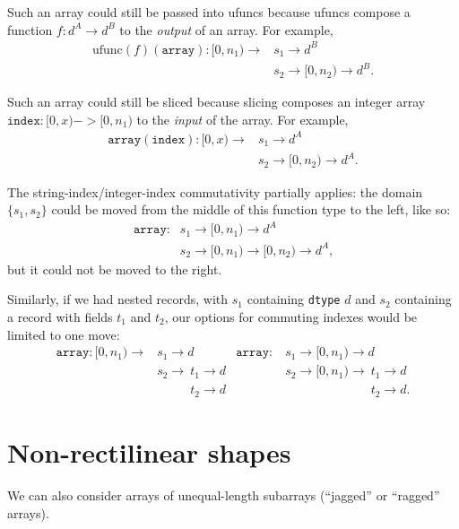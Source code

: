 \documentclass[12pt]{article}
\begin{document}
Such an array could still be passed into ufuncs because ufuncs compose a function $f: d^A \to d^B$ to the {\it output} of an array. For example,
\begin{align*}
\mbox{ufunc}(f)(\texttt{array}): [0, n_1) \to & s_1 \to d^B \\
 & s_2 \to [0, n_2) \to d^B\mbox{.}
\end{align*}

Such an array could still be sliced because slicing composes an integer array $\texttt{index}: [0, x) -> [0, n_1)$ to the {\it input} of the array. For example,
\begin{align*}
\texttt{array}(\texttt{index}): [0, x) \to & s_1 \to d^A \\
 & s_2 \to [0, n_2) \to d^A\mbox{.}
\end{align*}

The string-index/integer-index commutativity partially applies: the domain $\{s_1, s_2\}$ could be moved from the middle of this function type to the left, like so:
\begin{align*}
\texttt{array}: & s_1 \to [0, n_1) \to d^A \\
& s_2 \to [0, n_1) \to [0, n_2) \to d^A\mbox{,}
\end{align*}
\noindent but it could not be moved to the right.

Similarly, if we had nested records, with $s_1$ containing \texttt{dtype} $d$ and $s_2$ containing a record with fields $t_1$ and $t_2$, our options for commuting indexes would be limited to one move:
\begin{align*}
\texttt{array}: [0, n_1) \to & s_1 \to d & \texttt{array}: &\ s_1 \to [0, n_1) \to d \\
 & {s_2 \to\ }t_1 \to d                              & &\ {s_2 \to [0, n_1) \to\ }t_1 \to d \\
 & \phantom{s_2 \to\ }t_2 \to d                      & &\ \phantom{s_2 \to [0, n_1) \to\ }t_2 \to d\mbox{.}
\end{align*}

\vfill

\section*{Non-rectilinear shapes}

We can also consider arrays of unequal-length subarrays (``jagged'' or ``ragged'' arrays).
\end{document}
